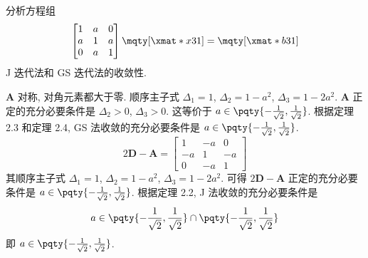 \documentclass[lang = zh]{iwork}
\begin{document}
\begin{prob}
  分析方程组
  \begin{equation*}
    \begin{bmatrix}
      1 & a & 0 \\
      a & 1 & a \\
      0 & a & 1 \\
    \end{bmatrix}
    \mqty[\xmat*{x}{3}{1}]
    =
    \mqty[\xmat*{b}{3}{1}]
  \end{equation*}
  J 迭代法和 GS 迭代法的收敛性.
\end{prob}
\begin{sol}
  $\bm{A}$ 对称, 对角元素都大于零.
  顺序主子式 $\Delta_1 = 1$, $\Delta_2 = 1 - a^2$, $\Delta_3 = 1 - 2 a^2$.
  $\bm{A}$ 正定的充分必要条件是 $\Delta_2 > 0$, $\Delta_3 > 0$.
  这等价于 $a \in \pqty{-\frac{1}{\sqrt{2}}, \frac{1}{\sqrt{2}}}$.
  根据定理 2.3 和定理 2.4, GS 法收敛的充分必要条件是 $a \in \pqty{-\frac{1}{\sqrt{2}}, \frac{1}{\sqrt{2}}}$.
  \begin{equation*}
    2 \bm{D} - \bm{A} =
    \begin{bmatrix}
      1  & -a & 0  \\
      -a & 1  & -a \\
      0  & -a & 1
    \end{bmatrix}
  \end{equation*}
  其顺序主子式 $\Delta_1 = 1$, $\Delta_2 = 1 - a^2$, $\Delta_3 = 1 - 2 a^2$.
  可得 $2 \bm{D} - \bm{A}$ 正定的充分必要条件是 $a \in \pqty{-\frac{1}{\sqrt{2}}, \frac{1}{\sqrt{2}}}$.
  根据定理 2.2, J 法收敛的充分必要条件是
  \begin{equation*}
    a \in \pqty{-\frac{1}{\sqrt{2}}, \frac{1}{\sqrt{2}}} \cap \pqty{-\frac{1}{\sqrt{2}}, \frac{1}{\sqrt{2}}}
  \end{equation*}
  即 $a \in \pqty{-\frac{1}{\sqrt{2}}, \frac{1}{\sqrt{2}}}$.
\end{sol}
\end{document}
